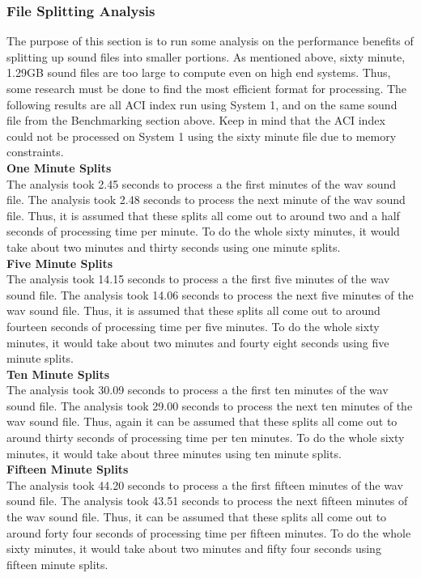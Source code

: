 \subsubsection{File Splitting Analysis}
The purpose of this section is to run some analysis on the performance benefits of splitting up sound files into smaller portions. As mentioned above, sixty minute, 1.29GB sound files are too large to compute even on high end systems. Thus, some research must be done to find the most efficient format for processing. The following results are all ACI index run using System 1, and on the same sound file from the Benchmarking section above. Keep in mind that the ACI index could not be processed on System 1 using the sixty minute file due to memory constraints.\\

\noindent\textbf{One Minute Splits}\\
The analysis took 2.45 seconds to process a the first minutes of the wav sound file. The analysis took 2.48 seconds to process the next minute of the wav sound file. Thus, it is assumed that these splits all come out to around two and a half seconds of processing time per minute. To do the whole sixty minutes, it would take about two minutes and thirty seconds using one minute splits.\\

\noindent\textbf{Five Minute Splits}\\
The analysis took 14.15 seconds to process a the first five minutes of the wav sound file. The analysis took 14.06 seconds to process the next five minutes of the wav sound file. Thus, it is assumed that these splits all come out to around fourteen seconds of processing time per five minutes. To do the whole sixty minutes, it would take about two minutes and fourty eight seconds using five minute splits.\\

\noindent\textbf{Ten Minute Splits}\\
The analysis took 30.09 seconds to process a the first ten minutes of the wav sound file. The analysis took 29.00 seconds to process the next ten minutes of the wav sound file. Thus, again it can be assumed that these splits all come out to around thirty seconds of processing time per ten minutes. To do the whole sixty minutes, it would take about three minutes using ten minute splits.\\

\noindent\textbf{Fifteen Minute Splits}\\
The analysis took 44.20 seconds to process a the first fifteen minutes of the wav sound file. The analysis took 43.51 seconds to process the next fifteen minutes of the wav sound file. Thus, it can be assumed that these splits all come out to around forty four seconds of processing time per fifteen minutes. To do the whole sixty minutes, it would take about two minutes and fifty four seconds using fifteen minute splits.\\


